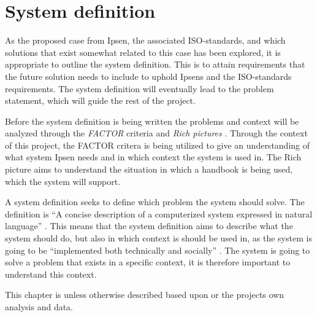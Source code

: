 \section{System definition}\label{sec:SystemDefinition}
As the proposed case from Ipsen, the associated ISO-standards, and which solutions that exist somewhat related to this case has been explored, it is appropriate to outline the system definition.
This is to attain requirements that the future solution needs to include to uphold Ipsens and the ISO-standards requirements.
The system definition will eventually lead to the problem statement, which will guide the rest of the project.

Before the system definition is being written the problems and context will be analyzed through the \textit{FACTOR} criteria and \textit{Rich pictures} \citep{Rod-Aalborg}.
Through the context of this project, the FACTOR critera is being utilized to give an understanding of what system Ipsen needs and in which context the system is used in.
The Rich picture aims to understand the situation in which a handbook is being used, which the system will support.

A system definition seeks to define which problem the system should solve.
The definition is “A concise description of a computerized system expressed in natural language” \citep[p.~24]{Rod-Aalborg}.
This means that the system definition aims to describe what the system should do, but also in which context is should be used in, as the system is going to be “implemented both technically and socially” \citep[p.~23]{Rod-Aalborg}.
The system is going to solve a problem that exists in a specific context, it is therefore important to understand this context.

This chapter is unless otherwise described based upon \cite{Rod-Aalborg} or the projects own analysis and data.

